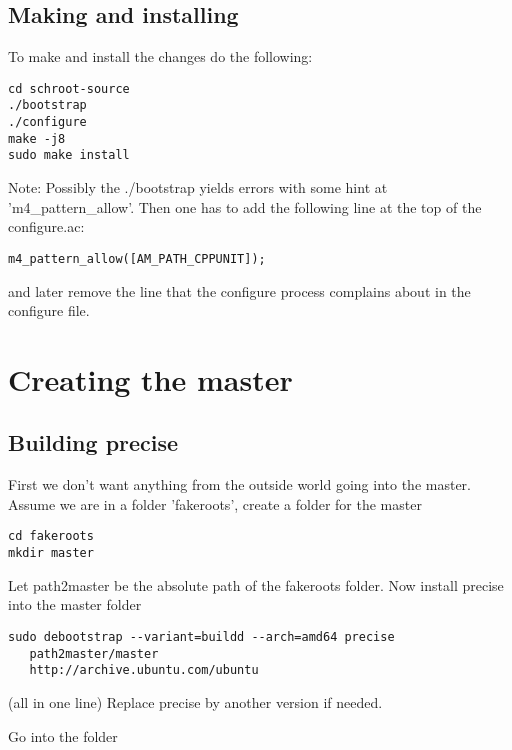 \documentclass[a4paper]{book}
\begin{document}
\subsection{Making and installing}
To make and install the changes do the following:
\begin{verbatim}
cd schroot-source
./bootstrap
./configure
make -j8
sudo make install
\end{verbatim}

Note: Possibly the ./bootstrap yields errors with some hint at 'm4\_pattern\_allow'. Then one has to add the following line at the top of the configure.ac:
\begin{verbatim}
m4_pattern_allow([AM_PATH_CPPUNIT]);
\end{verbatim}
and later remove the line that the configure process complains about in the configure file.


\section{Creating the master}
\subsection{Building precise}
First we don't want anything from the outside world going into the master.
Assume we are in a folder 'fakeroots', create a folder for the master

\begin{verbatim}
cd fakeroots
mkdir master
\end{verbatim}

Let path2master be the absolute path of the fakeroots folder.
Now install precise into the master folder

\begin{verbatim}
sudo debootstrap --variant=buildd --arch=amd64 precise 
   path2master/master 
   http://archive.ubuntu.com/ubuntu
\end{verbatim}

(all in one line)
Replace precise by another version if needed.

Go into the folder
\end{document}
